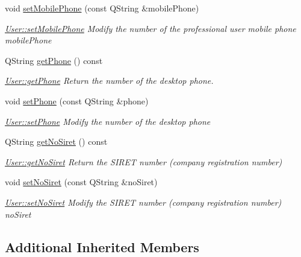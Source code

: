 \begin{DoxyCompactItemize}
void \hyperlink{classModels_1_1User_abed6684c24a3ba695a90a69a3a6d7572}{set\+Mobile\+Phone} (const Q\+String \&mobile\+Phone)
\begin{DoxyCompactList}\small\item\em \hyperlink{classModels_1_1User_abed6684c24a3ba695a90a69a3a6d7572}{User\+::set\+Mobile\+Phone} Modify the number of the professional user mobile phone {\itshape mobile\+Phone} \end{DoxyCompactList}\item 
Q\+String \hyperlink{classModels_1_1User_adc8fbd6d75a41d9ac9ee9473d781d1c1}{get\+Phone} () const 
\begin{DoxyCompactList}\small\item\em \hyperlink{classModels_1_1User_adc8fbd6d75a41d9ac9ee9473d781d1c1}{User\+::get\+Phone} Return the number of the desktop phone. \end{DoxyCompactList}\item 
void \hyperlink{classModels_1_1User_adb132ecafc7cc0afd42fc260f8a2e7b9}{set\+Phone} (const Q\+String \&phone)
\begin{DoxyCompactList}\small\item\em \hyperlink{classModels_1_1User_adb132ecafc7cc0afd42fc260f8a2e7b9}{User\+::set\+Phone} Modify the number of the desktop {\itshape phone} \end{DoxyCompactList}\item 
Q\+String \hyperlink{classModels_1_1User_a617ee9ede3791842fbf8593f08660d37}{get\+No\+Siret} () const 
\begin{DoxyCompactList}\small\item\em \hyperlink{classModels_1_1User_a617ee9ede3791842fbf8593f08660d37}{User\+::get\+No\+Siret} Return the S\+I\+R\+E\+T number (company registration number) \end{DoxyCompactList}\item 
void \hyperlink{classModels_1_1User_ae751ee06859dffce0cad08005c42c933}{set\+No\+Siret} (const Q\+String \&no\+Siret)
\begin{DoxyCompactList}\small\item\em \hyperlink{classModels_1_1User_ae751ee06859dffce0cad08005c42c933}{User\+::set\+No\+Siret} Modify the S\+I\+R\+E\+T number (company registration number) {\itshape no\+Siret} \end{DoxyCompactList}\end{DoxyCompactItemize}
\subsection*{Additional Inherited Members}


